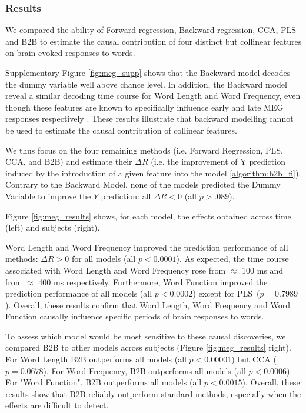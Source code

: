 \subsubsection{Results}
We compared the ability of Forward regression, Backward regression, CCA, PLS and B2B to estimate the causal contribution of four distinct but collinear features on brain evoked responses to words.

Supplementary Figure \ref{fig:meg_supp} shows that the Backward model decodes the dummy variable well above chance level. In addition, the Backward model reveal a similar decoding time course for Word Length and Word Frequency, even though these features are known to specifically influence early and late MEG responses respectively \citep{kutas2011thirty}. These results illustrate that backward modelling cannot be used to estimate the causal contribution of collinear features.

We thus focus on the four remaining methods (i.e. Forward Regression, PLS, CCA, and B2B) and estimate their $\Delta R$ (i.e. the improvement of Y prediction induced by the introduction of a given feature into the model \ref{algorithm:b2b_fi}). Contrary to the Backward Model, none of the models predicted the Dummy Variable to improve the $Y$ prediction: all $\Delta R < 0$ (all $p > .089$).

Figure \ref{fig:meg_results} shows, for each model, the effects obtained across time (left) and subjects (right).

Word Length and Word Frequency improved the prediction performance of all methods: $\Delta R>0$ for all models (all $p<0.0001$). As expected, the time course associated with Word Length and Word Frequency rose from $\approx$ 100 ms and from $\approx$ 400 ms respectively. Furthermore, Word Function improved the prediction performance of all models (all $p < 0.0002$) except for PLS~($p=0.7989$). Overall, these results confirm that Word Length, Word Frequency and Word Function causally influence specific periods of brain responses to words.

To assess which model would be most sensitive to these causal discoveries, we compared B2B to other models across subjects (Figure \ref{fig:meg_results} right). For Word Length B2B outperforms all models (all $p < 0.00001$) but CCA ($p=0.0678$). For Word Frequency, B2B outperforms all models (all $p < 0.0006$). For "Word Function", B2B outperforms all models (all $p < 0.0015$). Overall, these results show that B2B reliably outperform standard methods, especially when the effects are difficult to detect.
